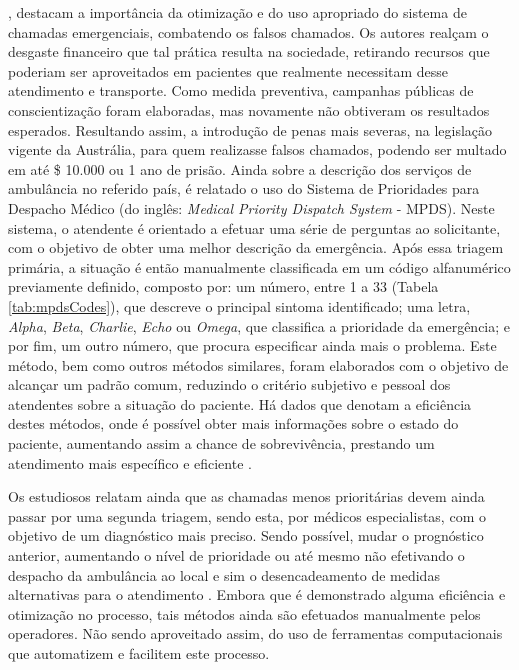 \cite{rashford2010optimizing}, destacam a importância da otimização e do uso apropriado do sistema de chamadas emergenciais, combatendo os falsos chamados. Os autores realçam o desgaste financeiro que tal prática resulta na sociedade, retirando recursos que poderiam ser aproveitados em pacientes que realmente necessitam desse atendimento e transporte. Como medida preventiva, campanhas públicas de conscientização foram elaboradas, mas novamente não obtiveram os resultados esperados. Resultando assim, a introdução de penas mais severas, na legislação vigente da Austrália,  para quem realizasse falsos chamados, podendo ser multado em até \$ 10.000 ou 1 ano de prisão. 
Ainda sobre a descrição dos serviços de ambulância no referido país, é relatado o uso do Sistema de Prioridades para Despacho Médico (do inglês: \textit{Medical Priority Dispatch System} - MPDS). Neste sistema, o atendente é orientado a efetuar uma série de perguntas ao solicitante, com o objetivo de obter uma melhor descrição da emergência. Após essa triagem primária, a situação é então manualmente classificada em um código alfanumérico previamente definido, composto por: um número, entre 1 a 33 (Tabela \ref{tab:mpdsCodes}), que descreve o principal sintoma identificado; uma letra, \textit{Alpha}, \textit{Beta}, \textit{Charlie}, \textit{Echo} ou \textit{Omega}, que classifica a prioridade da emergência; e por fim, um outro número, que procura especificar ainda mais o problema.
Este método, bem como outros métodos similares, foram elaborados com o objetivo de alcançar um padrão comum, reduzindo o critério subjetivo e pessoal dos atendentes sobre a situação do paciente. Há dados que denotam a eficiência destes métodos, onde é possível obter mais informações sobre o estado do paciente, aumentando assim a chance de sobrevivência, prestando um atendimento mais específico e eficiente \citep{gray2008ampds}.

Os estudiosos relatam ainda que as chamadas menos prioritárias devem ainda passar por uma segunda triagem, sendo esta, por médicos especialistas, com o objetivo de um diagnóstico mais preciso. Sendo possível, mudar o prognóstico anterior, aumentando o nível de prioridade ou até mesmo não efetivando o despacho da ambulância ao local e sim o desencadeamento de medidas alternativas para o atendimento \citep{marks2002emergency, gray2008ampds}. Embora que é demonstrado alguma eficiência e otimização no processo, tais métodos ainda são efetuados manualmente pelos operadores. Não sendo aproveitado assim, do uso de ferramentas computacionais que automatizem e facilitem este processo.

